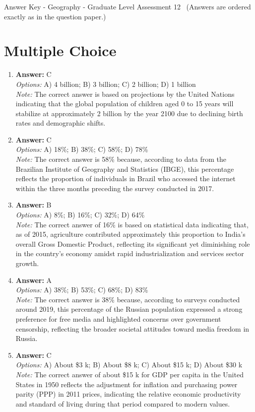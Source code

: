 \documentclass[12pt]{article}
\begin{document}
\begin{center}
Answer Key - Geography - Graduate Level Assessment 12 \
\small (Answers are ordered exactly as in the question paper.)
\end{center}

\section*{Multiple Choice}
\begin{enumerate}[label=\arabic*.]
\item \textbf{Answer:} C
\\ \textit{Options:} A) 4 billion; B) 3 billion; C) 2 billion; D) 1 billion
\\ \textit{Note:} The correct answer is based on projections by the United Nations indicating that the global population of children aged 0 to 15 years will stabilize at approximately 2 billion by the year 2100 due to declining birth rates and demographic shifts.
\item \textbf{Answer:} C
\\ \textit{Options:} A) 18\%; B) 38\%; C) 58\%; D) 78\%
\\ \textit{Note:} The correct answer is 58\% because, according to data from the Brazilian Institute of Geography and Statistics (IBGE), this percentage reflects the proportion of individuals in Brazil who accessed the internet within the three months preceding the survey conducted in 2017.
\item \textbf{Answer:} B
\\ \textit{Options:} A) 8\%; B) 16\%; C) 32\%; D) 64\%
\\ \textit{Note:} The correct answer of 16\% is based on statistical data indicating that, as of 2015, agriculture contributed approximately this proportion to India's overall Gross Domestic Product, reflecting its significant yet diminishing role in the country's economy amidst rapid industrialization and services sector growth.
\item \textbf{Answer:} A
\\ \textit{Options:} A) 38\%; B) 53\%; C) 68\%; D) 83\%
\\ \textit{Note:} The correct answer is 38\% because, according to surveys conducted around 2019, this percentage of the Russian population expressed a strong preference for free media and highlighted concerns over government censorship, reflecting the broader societal attitudes toward media freedom in Russia.
\item \textbf{Answer:} C
\\ \textit{Options:} A) About \$3 k; B) About \$8 k; C) About \$15 k; D) About \$30 k
\\ \textit{Note:} The correct answer of about \$15 k for GDP per capita in the United States in 1950 reflects the adjustment for inflation and purchasing power parity (PPP) in 2011 prices, indicating the relative economic productivity and standard of living during that period compared to modern values.
\end{enumerate}
\end{document}
